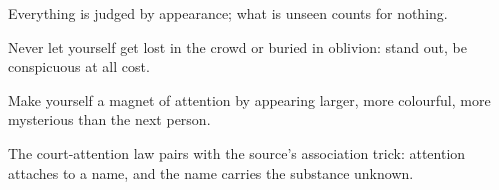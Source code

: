 

\begin{distilled}
  \item Everything is judged by appearance; what is unseen counts for nothing.
  \item Never let yourself get lost in the crowd or buried in oblivion: stand out, be conspicuous at all cost.
  \item Make yourself a magnet of attention by appearing larger, more colourful, more mysterious than the next person.
  \item The court-attention law pairs with the source's association trick: attention attaches to a name, and the name carries the substance unknown.
\end{distilled}
